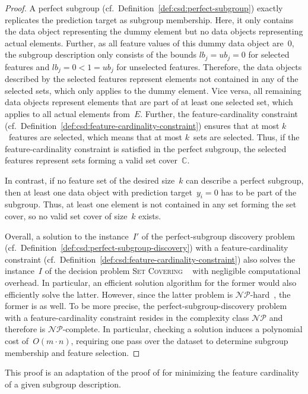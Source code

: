 \documentclass{article}
\theoremstyle{definition}
\begin{document}
\begin{proof}
A perfect subgroup (cf.~Definition~\ref{def:csd:perfect-subgroup}) exactly replicates the prediction target as subgroup membership.
Here, it only contains the data object representing the dummy element but no data objects representing actual elements.
Further, as all feature values of this dummy data object are~0, the subgroup description only consists of the bounds $\mathit{lb}_j = \mathit{ub}_j = 0$ for selected features and $\mathit{lb}_j = 0 < 1 = \mathit{ub}_j$ for unselected features.
Therefore, the data objects described by the selected features represent elements not contained in any of the selected sets, which only applies to the dummy element.
Vice versa, all remaining data objects represent elements that are part of at least one selected set, which applies to all actual elements from~$E$.
Further, the feature-cardinality constraint (cf.~Definition~\ref{def:csd:feature-cardinality-constraint}) ensures that at most $k$~features are selected, which means that at most $k$~sets are selected.
Thus, if the feature-cardinality constraint is satisfied in the perfect subgroup, the selected features represent sets forming a valid set cover~$\mathbb{C}$.

In contrast, if no feature set of the desired size~$k$ can describe a perfect subgroup, then at least one data object with prediction target~$y_i = 0$ has to be part of the subgroup.
Thus, at least one element is not contained in any set forming the set cover, so no valid set cover of size~$k$ exists.

Overall, a solution to the instance~$I'$ of the perfect-subgroup discovery problem (cf.~Definition~\ref{def:csd:perfect-subgroup-discovery}) with a feature-cardinality constraint (cf.~Definition~\ref{def:csd:feature-cardinality-constraint}) also solves the instance~$I$ of the decision problem \textsc{Set Covering} ~\cite{karp1972reducibility} with negligible computational overhead.
In particular, an efficient solution algorithm for the former would also efficiently solve the latter.
However, since the latter problem is $\mathcal{NP}$-hard~\cite{karp1972reducibility}, the former is as well.
To be more precise, the perfect-subgroup-discovery problem with a feature-cardinality constraint resides in the complexity class $\mathcal{NP}$ and therefore is $\mathcal{NP}$-complete.
In particular, checking a solution induces a polynomial cost of~$O(m \cdot n)$, requiring one pass over the dataset to determine subgroup membership and feature selection.
\end{proof}
%
This proof is an adaptation of the proof of \cite{boley2009non} for minimizing the feature cardinality of a given subgroup description.
\end{document}
